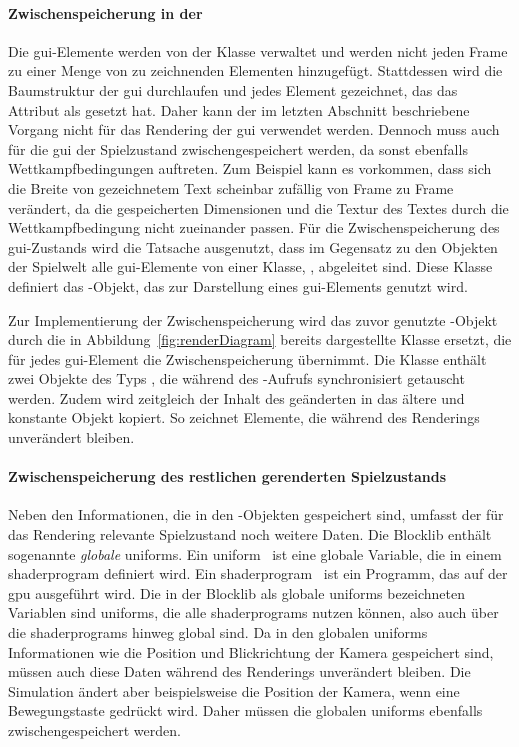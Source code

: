 \paragraph{Zwischenspeicherung in der }
Die \ac{gui}-Elemente werden von der Klasse \classUIRenderer{} verwaltet und werden nicht jeden Frame zu einer Menge von zu zeichnenden Elementen hinzugefügt. 
Stattdessen wird die Baumstruktur der \ac{gui} durchlaufen und jedes Element gezeichnet, das das Attribut  als  gesetzt hat. Daher kann der im letzten Abschnitt beschriebene Vorgang nicht für das Rendering der \ac{gui} verwendet werden. Dennoch muss auch für die \ac{gui} der Spielzustand zwischengespeichert werden, da sonst ebenfalls Wettkampfbedingungen auftreten. Zum Beispiel kann es vorkommen, dass sich die Breite von gezeichnetem Text scheinbar zufällig von Frame zu Frame verändert, da die gespeicherten Dimensionen und die Textur des Textes durch die Wettkampfbedingung nicht zueinander passen. Für die Zwischenspeicherung des \ac{gui}-Zustands wird die Tatsache ausgenutzt, dass im Gegensatz zu den Objekten der Spielwelt alle \ac{gui}-Elemente von einer Klasse, \classUIItem{}, abgeleitet sind. Diese Klasse definiert das \classRenderable{}-Objekt, das zur Darstellung eines \ac{gui}-Elements genutzt wird. 

Zur Implementierung der Zwischenspeicherung wird das zuvor genutzte \classUIRenderable{}-Objekt durch die in Abbildung~\ref{fig:renderDiagram} bereits dargestellte Klasse \classDoubleBufferedUIRenderable{} ersetzt, die für jedes \ac{gui}-Element die Zwischenspeicherung übernimmt. Die Klasse enthält zwei Objekte des Typs \classUIRenderable{}, die während des -Aufrufs synchronisiert getauscht werden. Zudem wird zeitgleich der Inhalt des geänderten \classUIRenderable{} in das ältere und konstante Objekt kopiert. So zeichnet \classUIRenderer{} Elemente, die während des Renderings unverändert bleiben.

\paragraph{Zwischenspeicherung des restlichen gerenderten Spielzustands} Neben den Informationen, die in den  \classRenderable{}-Objekten gespeichert sind, umfasst der für das Rendering relevante Spielzustand noch weitere Daten. 
Die Blocklib enthält sogenannte \emph{globale} \glspl{uniform}. Ein \gls{uniform}~\cite[S.~45~\psqq]{Vries2020} ist eine globale Variable, die in einem \gls{shaderprogram} definiert wird. Ein \gls{shaderprogram}~\cite[S.~32~\psq]{Vries2020} ist ein \gls{Programm}, das auf der \ac{gpu} ausgeführt wird. Die in der Blocklib als globale \glspl{uniform} bezeichneten Variablen sind \glspl{uniform}, die alle \glspl{shaderprogram} nutzen können, also auch über die \glspl{shaderprogram} hinweg global sind. Da in den globalen \glspl{uniform} Informationen wie die Position und Blickrichtung der Kamera gespeichert sind, müssen auch diese Daten während des Renderings unverändert bleiben. Die Simulation ändert aber beispielsweise die Position der Kamera, wenn eine Bewegungstaste gedrückt wird. Daher müssen die globalen \glspl{uniform} ebenfalls zwischengespeichert werden.

